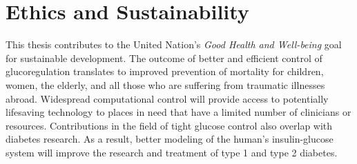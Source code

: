 \documentclass[nomenclature, english, bibtex]{kththesis}
\newcommand*{\engExpl}[1]{\todo[inline, backgroundcolor=kth-lightgreen40]{#1}} %
\begin{document}
\section{Ethics and Sustainability}

This thesis contributes to the United Nation's \textit{Good Health and Well-being} goal for sustainable development. The outcome of better and efficient control of glucoregulation translates to improved prevention of mortality for children, women, the elderly, and all those who are suffering from traumatic illnesses abroad. Widespread computational control will provide access to potentially lifesaving technology to places in need that have a limited number of clinicians or resources. Contributions in the field of tight glucose control also overlap with diabetes research. As a result, better modeling of the human's insulin-glucose system will improve the research and treatment of type 1 and type 2 diabetes.






\end{document}
